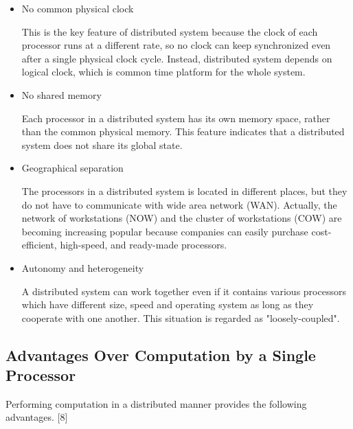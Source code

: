  \begin{itemize}
 
      \item No common physical clock 
      
      This is the key feature of distributed system because the clock of each processor runs at a different rate, so no clock can keep synchronized even after a single physical clock cycle.  Instead, distributed system depends on logical clock, which is common time platform for the whole system.
      
     \item No shared memory
     
     Each processor in a distributed system has its own memory space, rather than the common physical memory.  This feature indicates that a distributed system does not share its global state.
     
     
      \item Geographical separation
      
      The processors in a distributed system is located in different places, but they do not have to communicate with wide area network (WAN).  Actually, the network of workstations (NOW) and the cluster of workstations (COW) are becoming increasing popular because companies can easily purchase cost-efficient, high-speed, and ready-made processors. 
      
     \item Autonomy and heterogeneity
     
     A distributed system can work together even if it contains various processors which have different size, speed and operating system as long as they cooperate with one another.  This situation is regarded as "loosely-coupled".
     
\end{itemize}

\subsection{Advantages Over Computation by a Single Processor}

Performing computation in a distributed manner provides the following advantages. [8]


